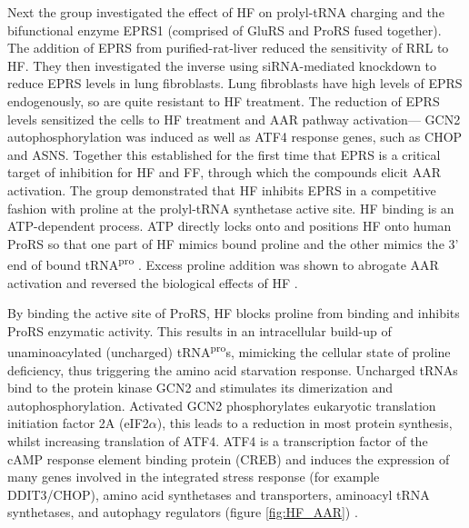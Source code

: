 Next the group investigated the effect of HF on prolyl-tRNA charging and the bifunctional enzyme EPRS1 (comprised of GluRS and ProRS fused together).
The addition of EPRS from purified-rat-liver reduced the sensitivity of RRL to HF.
They then investigated the inverse using siRNA-mediated knockdown to reduce EPRS levels in lung fibroblasts.
Lung fibroblasts have high levels of EPRS endogenously, so are quite resistant to HF treatment.
The reduction of EPRS levels sensitized the cells to HF treatment and AAR pathway activation--- GCN2 autophosphorylation was induced as well as ATF4 response genes, such as CHOP and ASNS\@.
Together this established for the first time that EPRS is a critical target of inhibition for HF and FF, through which the compounds elicit AAR activation.
The group demonstrated that HF inhibits EPRS in a competitive fashion with proline at the prolyl-tRNA synthetase active site.
HF binding is an ATP-dependent process.
ATP directly locks onto and positions HF onto human ProRS so that one part of HF mimics bound proline and the other mimics the 3' end of bound tRNA\textsuperscript{pro} \cite{zhou2013atp}.
Excess proline addition was shown to abrogate AAR activation and reversed the biological effects of HF \cite{keller2012halofuginone}.

By binding the active site of ProRS, HF blocks proline from binding and inhibits ProRS enzymatic activity.
This results in an intracellular build-up of unaminoacylated (uncharged) tRNA\textsuperscript{pro}s, mimicking the cellular state of proline deficiency, thus triggering the amino acid starvation response.
Uncharged tRNAs bind to the protein kinase GCN2 and stimulates its dimerization and autophosphorylation.
Activated GCN2 phosphorylates eukaryotic translation initiation factor 2A (eIF2$\alpha$), this leads to a reduction in most protein synthesis, whilst increasing translation of ATF4.
ATF4 is a transcription factor of the cAMP response element binding protein (CREB) and induces the expression of many genes involved in the integrated stress response (for example DDIT3/CHOP), amino acid synthetases and transporters, aminoacyl tRNA synthetases, and autophagy regulators (figure \ref{fig:HF_AAR}) \cite{ye2015gcn2, sundrud2009halofuginone}.

